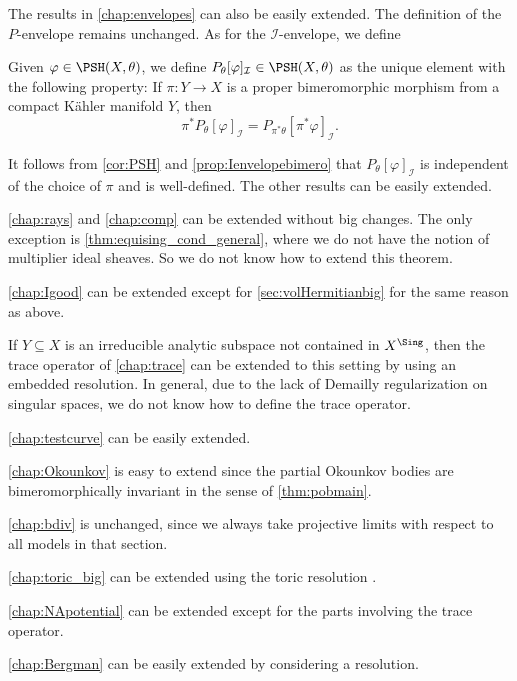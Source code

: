 The results in \cref{chap:envelopes} can also be easily extended. The definition of the $P$-envelope remains unchanged. As for the $\mathcal{I}$-envelope, we define
\begin{definition}\label{def:unibranch:L212}
    Given $\varphi\in \PSH(X,\theta)$, we define $P_{\theta}[\varphi]_{\mathcal{I}}\in \PSH(X,\theta)$ as the unique element with the following property: If $\pi\colon Y\rightarrow X$ is a proper bimeromorphic morphism from a compact K\"ahler manifold $Y$, then
    \[
        \pi^*P_{\theta}[\varphi]_{\mathcal{I}}=P_{\pi^*\theta}[\pi^*\varphi]_{\mathcal{I}}.
    \]
\end{definition}
It follows from \cref{cor:PSH} and \cref{prop:Ienvelopebimero} that $P_{\theta}[\varphi]_{\mathcal{I}}$ is independent of the choice of $\pi$ and is well-defined.
The other results can be easily extended.

\cref{chap:rays} and \cref{chap:comp} can be extended without big changes. The only exception is \cref{thm:equising_cond_general}, where we do not have the notion of multiplier ideal sheaves. So we do not know how to extend this theorem.

\cref{chap:Igood} can be extended except for \cref{sec:volHermitianbig} for the same reason as above.

If $Y\subseteq X$ is an irreducible analytic subspace not contained in $X^{\Sing}$, then the trace operator of \cref{chap:trace} can be extended to this setting by using an embedded resolution. In general, due to the lack of Demailly regularization on singular spaces, we do not know how to define the trace operator.

\cref{chap:testcurve} can be easily extended.

\cref{chap:Okounkov} is easy to extend since the partial Okounkov bodies are bimeromorphically invariant in the sense of \cref{thm:pobmain}.

\cref{chap:bdiv} is unchanged, since we always take projective limits with respect to all models in that section.

\cref{chap:toric_big} can be extended using the toric resolution \cite[Theorem~11.1.9]{CLS11}.

\cref{chap:NApotential} can be extended except for the parts involving the trace operator.

\cref{chap:Bergman} can be easily extended by considering a resolution.
